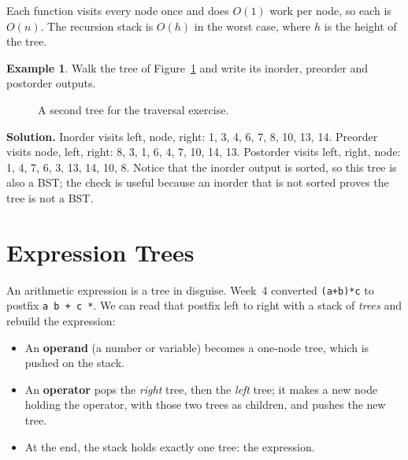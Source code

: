 \documentclass[11pt]{article}
\theoremstyle{definition}
\newtheorem{example}{Example}[section]
\begin{document}
Each function visits every node once and does $O(1)$ work per node, so each
is $O(n)$. The recursion stack is $O(h)$ in the worst case, where $h$ is the
height of the tree.

\begin{example}
Walk the tree of Figure~\ref{fig:check} and write its inorder, preorder and
postorder outputs.

\begin{figure}[h]
  \centering
  \caption{A second tree for the traversal exercise.}
  \label{fig:check}
\end{figure}

\textbf{Solution.} Inorder visits left, node, right: 1, 3, 4, 6, 7, 8, 10,
13, 14. Preorder visits node, left, right: 8, 3, 1, 6, 4, 7, 10, 14, 13.
Postorder visits left, right, node: 1, 4, 7, 6, 3, 13, 14, 10, 8. Notice
that the inorder output is sorted, so this tree is also a BST; the check is
useful because an inorder that is not sorted proves the tree is not a BST.
\end{example}

\section{Expression Trees}

An arithmetic expression is a tree in disguise. Week~4 converted
\texttt{(a+b)*c} to postfix \texttt{a b + c *}. We can read that postfix left
to right with a stack of \emph{trees} and rebuild the expression:

\begin{itemize}
  \item An \textbf{operand} (a number or variable) becomes a one-node tree,
    which is pushed on the stack.
  \item An \textbf{operator} pops the \emph{right} tree, then the \emph{left}
    tree; it makes a new node holding the operator, with those two trees as
    children, and pushes the new tree.
  \item At the end, the stack holds exactly one tree: the expression.
\end{itemize}
\end{document}
